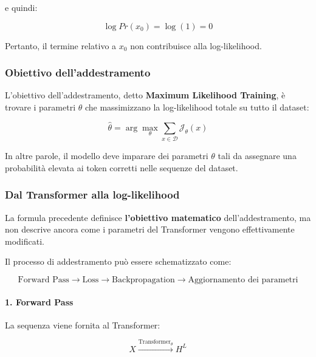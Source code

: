 e quindi:

\begin{equation}
\log Pr(x_0)=\log(1)=0
\end{equation}

Pertanto, il termine relativo a $x_0$ non contribuisce alla
log-likelihood.

\subsubsection{Obiettivo dell'addestramento}

L'obiettivo dell'addestramento, detto \textbf{Maximum Likelihood
Training}, è trovare i parametri $\hat{\theta}$ che massimizzano la
log-likelihood totale su tutto il dataset:

\begin{equation}
\hat{\theta}
=
\arg\max_\theta
\sum_{x \in \mathcal{D}}
\mathcal{J}_\theta(x)
\end{equation}

In altre parole, il modello deve imparare dei parametri $\theta$ tali
da assegnare una probabilità elevata ai token corretti nelle sequenze
del dataset.

\subsubsection{Dal Transformer alla log-likelihood}

La formula precedente definisce \textbf{l'obiettivo matematico}
dell'addestramento, ma non descrive ancora come i parametri del
Transformer vengono effettivamente modificati.

Il processo di addestramento può essere schematizzato come:

\begin{equation}
\boxed{
\text{Forward Pass}
\rightarrow
\text{Loss}
\rightarrow
\text{Backpropagation}
\rightarrow
\text{Aggiornamento dei parametri}
}
\end{equation}

\paragraph{1. Forward Pass}

La sequenza viene fornita al Transformer:

\begin{equation}
X
\overset{\text{Transformer}_\theta}{\longrightarrow}
H^L
\end{equation}

